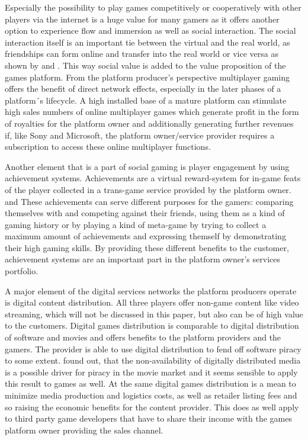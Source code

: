 \documentclass
[
    a4paper,
    11pt
]
{article}
\begin{document}
Especially the possibility to play games competitively or cooperatively with other players via the internet
is a huge value for many gamers as it offers another option to experience flow and immersion
as well as social interaction. \cite{Hsu2004}  The social interaction itself is an important tie between
the virtual and the real world, as friendships can form online and transfer into the real world or vice versa
as shown by \cite{Domahidi2014} and \cite{Trepte2012}. This way social value is
added to the value proposition of the games platform. From the platform producer's perspective multiplayer
gaming offers the benefit of direct network effects, especially in the later phases of a platform´s lifecycle.
A high installed base of a mature platform can stimulate high sales numbers of online multiplayer games which
generate profit in the form of royalties for the platform owner \cite{Marchand2016} and additionally generating
further revenues if, like Sony and Microsoft, the platform owner/service provider requires a subscription
to access these online multiplayer functions.

Another element that is a part of social gaming is player engagement by using
achievement systems. Achievements are a virtual reward-system for in-game feats of the
player collected in a trans-game service provided by the platform owner.
\cite{Jakobsson2011} and \cite{Hamari2011} These achievements can serve different purposes for the
gamers: comparing themselves with and competing against their friends, using
them as a kind of gaming history or by playing a kind of meta-game by trying
to collect a maximum amount of achievements and expressing themself by demonstrating
their high gaming skills. \cite{Jakobsson2011} By providing these different
benefits to the customer, achievement systems are an important part in the
platform owner's services portfolio.

A major element of the digital services networks the platform producers operate
is digital content distribution. All three players offer non-game content like
video streaming, which will not be discussed in this paper, but also can be of high value to
the customers. Digital games distribution is comparable to digital distribution
of software and movies and offers benefits to the platform providers and the
gamers. The provider is able to use digital distribution to fend off software
piracy to some extent. \cite{Danaher2010} found out, that the non-availability
of digitally distributed media is a possible driver for piracy in the movie
market and it seems sensible to apply this result to games as well. At the same
digital games distribution is a mean to minimize media production and logistics
costs, as well as retailer listing fees and so raising the economic benefits for
the content provider. This does as well apply to third party game developers
that have to share their income with the games platform owner providing the
sales channel.
\end{document}
